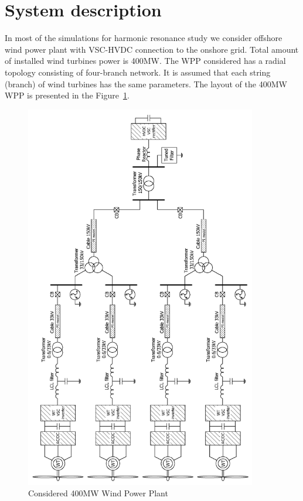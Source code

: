 \documentclass[12pt]{report} %
\begin{document}
\section{System description}
In most of the simulations for harmonic resonance study we consider offshore wind power plant with VSC-HVDC connection to the onshore grid. Total amount of installed wind turbines power is 400MW. The WPP considered has a radial topology consisting of four-branch network. It is assumed that each string (branch) of wind turbines has the same parameters. The layout of the 400MW WPP is presented in the Figure~\ref{fig:systemfull}.

\begin{figure}[htb]
	\centering
	\includegraphics[width=0.9\textwidth]{img/system_full.png}
  	\caption{Considered 400MW Wind Power Plant}
  	\label{fig:systemfull}
\end{figure}
\FloatBarrier
\end{document}
